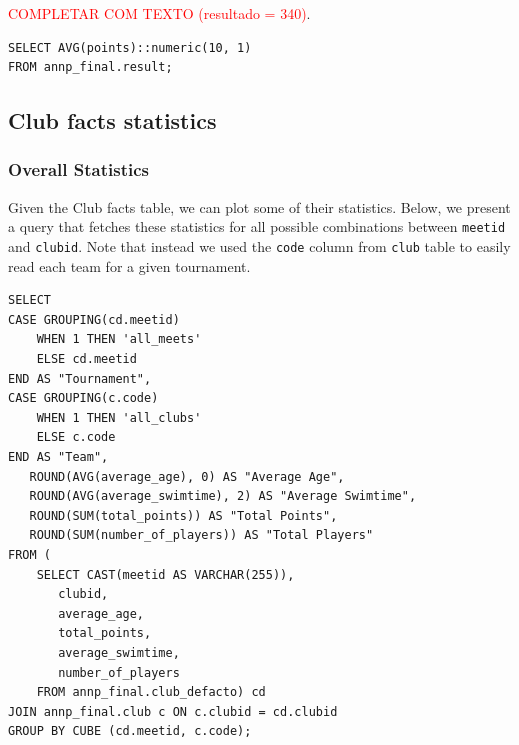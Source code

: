\textcolor{red}{COMPLETAR COM TEXTO (resultado = 340)}.
\begin{verbatim}
SELECT AVG(points)::numeric(10, 1)
FROM annp_final.result;
\end{verbatim}

\subsection{Club facts statistics}

\subsubsection{Overall Statistics}

Given the Club facts table, we can plot some of their statistics. Below, we present a query that fetches these statistics for all possible combinations
between \texttt{meetid} and \texttt{clubid}. Note that instead we used the \texttt{code} column from \texttt{club} table to easily read each team for 
a given tournament. 

\begin{verbatim}
SELECT 
CASE GROUPING(cd.meetid)
    WHEN 1 THEN 'all_meets'
    ELSE cd.meetid
END AS "Tournament",
CASE GROUPING(c.code)
    WHEN 1 THEN 'all_clubs'
    ELSE c.code
END AS "Team",
   ROUND(AVG(average_age), 0) AS "Average Age",
   ROUND(AVG(average_swimtime), 2) AS "Average Swimtime",
   ROUND(SUM(total_points)) AS "Total Points",
   ROUND(SUM(number_of_players)) AS "Total Players"
FROM (
    SELECT CAST(meetid AS VARCHAR(255)),
       clubid,
       average_age,
       total_points,
       average_swimtime,
       number_of_players
    FROM annp_final.club_defacto) cd
JOIN annp_final.club c ON c.clubid = cd.clubid
GROUP BY CUBE (cd.meetid, c.code);
\end{verbatim}


